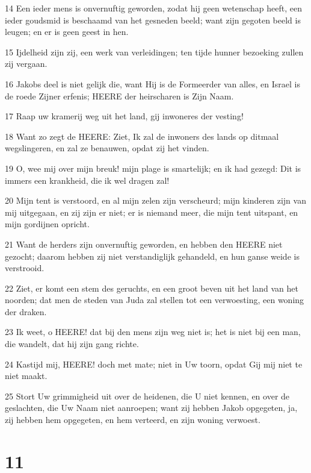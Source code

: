 \par 14 Een ieder mens is onvernuftig geworden, zodat hij geen wetenschap heeft, een ieder goudsmid is beschaamd van het gesneden beeld; want zijn gegoten beeld is leugen; en er is geen geest in hen.
\par 15 Ijdelheid zijn zij, een werk van verleidingen; ten tijde hunner bezoeking zullen zij vergaan.
\par 16 Jakobs deel is niet gelijk die, want Hij is de Formeerder van alles, en Israel is de roede Zijner erfenis; HEERE der heirscharen is Zijn Naam.
\par 17 Raap uw kramerij weg uit het land, gij inwoneres der vesting!
\par 18 Want zo zegt de HEERE: Ziet, Ik zal de inwoners des lands op ditmaal wegslingeren, en zal ze benauwen, opdat zij het vinden.
\par 19 O, wee mij over mijn breuk! mijn plage is smartelijk; en ik had gezegd: Dit is immers een krankheid, die ik wel dragen zal!
\par 20 Mijn tent is verstoord, en al mijn zelen zijn verscheurd; mijn kinderen zijn van mij uitgegaan, en zij zijn er niet; er is niemand meer, die mijn tent uitspant, en mijn gordijnen opricht.
\par 21 Want de herders zijn onvernuftig geworden, en hebben den HEERE niet gezocht; daarom hebben zij niet verstandiglijk gehandeld, en hun ganse weide is verstrooid.
\par 22 Ziet, er komt een stem des geruchts, en een groot beven uit het land van het noorden; dat men de steden van Juda zal stellen tot een verwoesting, een woning der draken.
\par 23 Ik weet, o HEERE! dat bij den mens zijn weg niet is; het is niet bij een man, die wandelt, dat hij zijn gang richte.
\par 24 Kastijd mij, HEERE! doch met mate; niet in Uw toorn, opdat Gij mij niet te niet maakt.
\par 25 Stort Uw grimmigheid uit over de heidenen, die U niet kennen, en over de geslachten, die Uw Naam niet aanroepen; want zij hebben Jakob opgegeten, ja, zij hebben hem opgegeten, en hem verteerd, en zijn woning verwoest.

\chapter{11}

